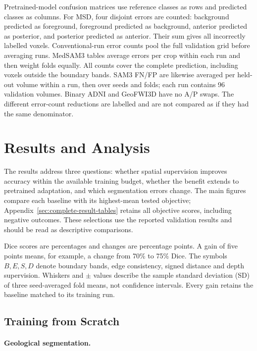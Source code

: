 \documentclass[12pt,a4paper]{article}
\begin{document}
Pretrained-model confusion matrices use reference classes as rows and
predicted classes as columns. For MSD, four disjoint errors are counted: background
predicted as foreground, foreground predicted as background, anterior
predicted as posterior, and posterior predicted as anterior. Their
sum gives all incorrectly labelled voxels. Conventional-run error counts pool the full validation grid before
averaging runs. MedSAM3 tables average errors per crop within each run
and then weight folds equally. All counts cover the complete prediction,
including voxels outside the boundary bands. SAM3 FN/FP are likewise
averaged per held-out volume within a run, then over seeds and folds;
each run contains 96 validation volumes. Binary ADNI and GeoFWI3D have
no A/P swaps. The different error-count reductions are labelled and are not compared
as if they had the same denominator.

\clearpage

\section{Results and Analysis}
\label{sec:results}

The results address three questions: whether spatial supervision improves
accuracy within the available training budget, whether the benefit extends
to pretrained adaptation, and which segmentation errors change. The main
figures compare each baseline with its highest-mean tested objective;
Appendix~\ref{sec:complete-result-tables} retains all objective scores,
including negative outcomes. These selections use the reported validation
results and should be read as descriptive comparisons.

Dice scores are percentages and changes are percentage points. A gain of
five points means, for example, a change from 70\% to 75\% Dice. The
symbols $B,E,S,D$ denote boundary bands, edge consistency, signed distance
and depth supervision. Whiskers and $\pm$ values describe the sample
standard deviation (SD) of three seed-averaged fold means, not confidence
intervals. Every gain retains the baseline matched to its training run.

\subsection{Training from Scratch}
\paragraph{Geological segmentation.}
\label{sec:geo-results}
\end{document}

